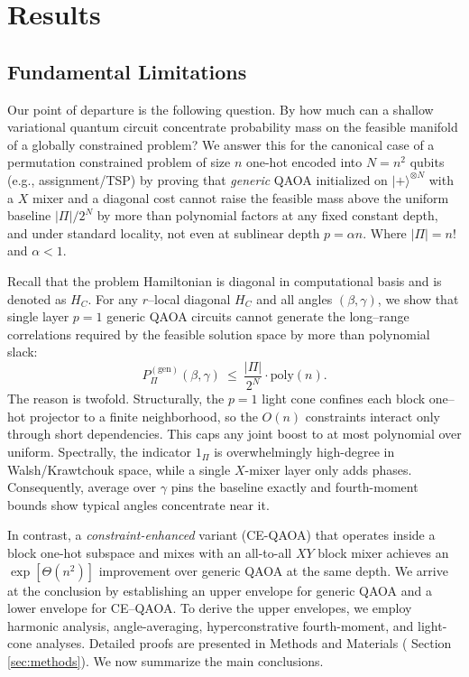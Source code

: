 \documentclass[a4paper,onecolumn,11pt,unpublished]{quantumarticle}
\theoremstyle{remark}
\begin{document}
\section{Results}
\label{sec:main}

\subsection{Fundamental Limitations}
\label{sec:upper}







Our point of departure is the following question. By how much can a shallow variational quantum circuit concentrate probability mass on the feasible manifold of a globally constrained problem?  We answer this for the canonical case of a permutation constrained problem of size $n$ one-hot encoded into $N=n^2$ qubits  (e.g., assignment/TSP) by proving that \emph{generic} QAOA initialized on \(|+\rangle^{\otimes N}\) with a $X$ mixer and a diagonal cost cannot raise the feasible mass above the uniform baseline \(|\Pi|/2^{N}\) by more than polynomial factors at any fixed constant depth, and under standard locality, not even at sublinear depth \(p=\alpha n\). Where $|\Pi|=n!$ and $\alpha < 1.$





\medskip
\noindent
Recall that the problem Hamiltonian is diagonal in computational basis and is denoted as $H_C$. For any $r$–local diagonal $H_C$ and all angles $(\beta,\gamma)$, we show that single layer $p=1$ generic QAOA circuits cannot generate the long–range correlations required by the feasible solution space by more than polynomial slack:
\begin{equation}
\label{eq:probs}
  P_{\Pi}^{\mathrm{(gen)}}(\beta,\gamma)\ \le\ \frac{|\Pi|}{2^{N}}\cdot \mathrm{poly}(n).
\end{equation}
The reason is twofold. Structurally, the $p{=}1$ light cone confines each block one–hot projector to a finite neighborhood, so the $O(n)$ constraints interact only through short dependencies. This caps any joint boost to at most polynomial over uniform. Spectrally, the indicator $1_\Pi$ is overwhelmingly high-degree in Walsh/Krawtchouk space, while a single $X$-mixer layer only adds phases. Consequently, average over $\gamma$ pins the baseline exactly and fourth-moment bounds show typical angles concentrate near it.


In contrast, a \emph{constraint-enhanced} variant (CE-QAOA) that operates inside a block one-hot subspace and mixes with an all-to-all \(XY\) block mixer achieves an \(\exp[\Theta(n^2)]\)  improvement over generic QAOA at the same depth. We arrive at the conclusion by establishing an upper envelope for generic QAOA and a lower envelope for CE--QAOA. To derive the upper envelopes, we employ harmonic analysis, angle-averaging, hyperconstrative fourth-moment, and light-cone analyses. Detailed proofs are presented in Methods and Materials ( Section \ref{sec:methods}).  We now summarize the main conclusions. %
\end{document}
